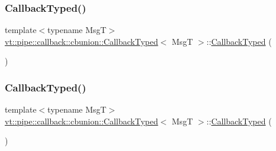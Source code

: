 \mbox{\label{structvt_1_1pipe_1_1callback_1_1cbunion_1_1_callback_typed_a059f829db7b3d792e7ea78f1a2ce24ab}} 
\subsubsection{\texorpdfstring{Callback\+Typed()}{CallbackTyped()}\hspace{0.1cm}{\footnotesize\ttfamily [2/14]}}
{\footnotesize\ttfamily template$<$typename MsgT$>$ \\
\hyperlink{structvt_1_1pipe_1_1callback_1_1cbunion_1_1_callback_typed}{vt\+::pipe\+::callback\+::cbunion\+::\+Callback\+Typed}$<$ MsgT $>$\+::\hyperlink{structvt_1_1pipe_1_1callback_1_1cbunion_1_1_callback_typed}{Callback\+Typed} (\begin{DoxyParamCaption}\item[{\hyperlink{structvt_1_1pipe_1_1callback_1_1cbunion_1_1_callback_typed}{Callback\+Typed}$<$ MsgT $>$ const \&}]{ }\end{DoxyParamCaption})\hspace{0.3cm}{\ttfamily [default]}}

\mbox{\label{structvt_1_1pipe_1_1callback_1_1cbunion_1_1_callback_typed_afc499cbc15b193928e02f5ed5c4a98ca}} 
\subsubsection{\texorpdfstring{Callback\+Typed()}{CallbackTyped()}\hspace{0.1cm}{\footnotesize\ttfamily [3/14]}}
{\footnotesize\ttfamily template$<$typename MsgT$>$ \\
\hyperlink{structvt_1_1pipe_1_1callback_1_1cbunion_1_1_callback_typed}{vt\+::pipe\+::callback\+::cbunion\+::\+Callback\+Typed}$<$ MsgT $>$\+::\hyperlink{structvt_1_1pipe_1_1callback_1_1cbunion_1_1_callback_typed}{Callback\+Typed} (\begin{DoxyParamCaption}\item[{\hyperlink{structvt_1_1pipe_1_1callback_1_1cbunion_1_1_callback_typed}{Callback\+Typed}$<$ MsgT $>$ \&\&}]{ }\end{DoxyParamCaption})\hspace{0.3cm}{\ttfamily [default]}}

